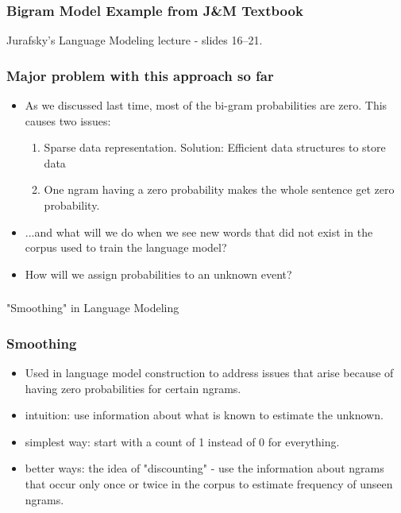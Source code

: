 \documentclass{beamer}
\begin{document}
\begin{frame}
\frametitle{Bigram Model Example from J\&M Textbook}
Jurafsky's Language Modeling lecture - slides 16--21.
\end{frame}

\begin{frame}
\frametitle{Major problem with this approach so far}
\begin{itemize}
\item As we discussed last time, most of the bi-gram probabilities are zero. This causes two issues:
\begin{enumerate}
\item Sparse data representation. Solution: Efficient data structures to store data
\item One ngram having a zero probability makes the whole sentence get zero probability.
\end{enumerate}
\item ...and what will we do when we see new words that did not exist in the corpus used to train the language model? 
\item How will we assign probabilities to an unknown event?
\end{itemize}
\end{frame}

\begin{frame}
\frametitle{}
\begin{center}
\Large "Smoothing" in Language Modeling
\end{center}
\end{frame}

\begin{frame}
\frametitle{Smoothing}
\begin{itemize}
\item Used in language model construction to address issues that arise because of having zero probabilities for certain ngrams.
\item intuition: use information about what is known to estimate the unknown.
\item simplest way: start with a count of 1 instead of 0 for everything.
\item better ways: the idea of "discounting" - use the information about ngrams that occur only once or twice in the corpus to estimate frequency of unseen ngrams.
\end{itemize}
\end{frame}
\end{document}
